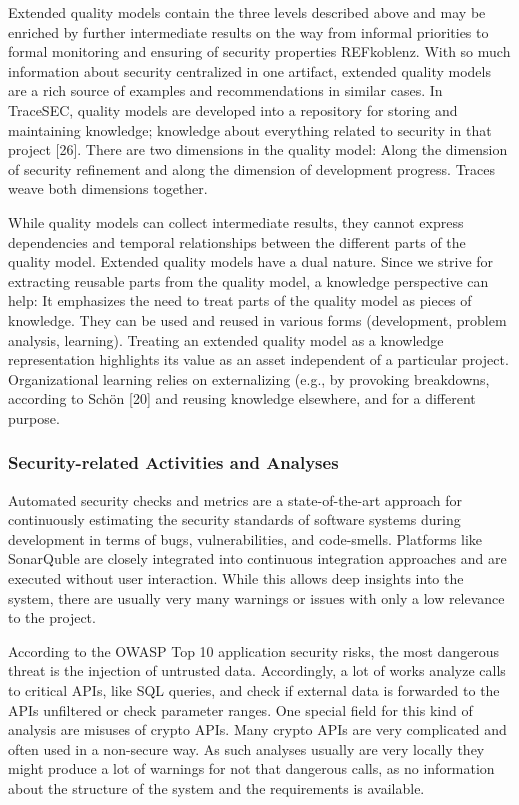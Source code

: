 Extended quality models contain the three levels described above and may be enriched by further intermediate results on the way from informal priorities to formal monitoring and ensuring of security properties REFkoblenz. With so much information about security centralized in one artifact, extended quality models are a rich source of examples and recommendations in similar cases. In TraceSEC, quality models are developed into a repository for storing and maintaining knowledge; knowledge about everything related to security in that project [26]. There are two dimensions in the quality model: Along the dimension of security refinement and along the dimension of development progress. Traces weave both dimensions together.

While quality models can collect intermediate results, they cannot express dependencies and temporal relationships between the different parts of the quality model. Extended quality models have a dual nature. Since we strive for extracting reusable parts from the quality model, a knowledge perspective can help: It emphasizes the need to treat parts of the quality model as pieces of knowledge. They can be used and reused in various forms (development, problem analysis, learning). Treating an extended quality model as a knowledge representation highlights its value as an asset independent of a particular project. Organizational learning relies on externalizing (e.g., by provoking breakdowns, according to Schön [20] and reusing knowledge elsewhere, and for a different purpose. 

\vspace{-0.5em}
\subsubsection*{Security-related Activities and Analyses}
\vspace{-1em}
Automated security checks and metrics are a state-of-the-art approach for continuously estimating the security standards of software systems during development in terms of bugs, vulnerabilities, and code-smells. Platforms like SonarQuble are closely integrated into continuous integration approaches and are executed without user interaction. While this allows deep insights into the system, there are usually very many warnings or issues with only a low relevance to the project.

According to the OWASP Top 10 application security risks, the most dangerous threat is the injection of untrusted data. Accordingly, a lot of works analyze calls to critical APIs, like SQL queries, and check if external data is forwarded to the APIs unfiltered or check parameter ranges. One special field for this kind of analysis are misuses of crypto APIs. Many crypto APIs are very complicated and often used in a non-secure way. As such analyses usually are very locally they might produce a lot of warnings for not that dangerous calls, as no information about the structure of the system and the requirements is available.

